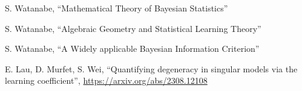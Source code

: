 \documentclass[a4paper,11pt]{amsart}
\begin{document}
\begin{thebibliography}{99}

 S. Watanabe, ``Mathematical Theory of Bayesian Statistics''

 S. Watanabe, ``Algebraic Geometry and Statistical Learning Theory''

 S. Watanabe, ``A Widely applicable Bayesian Information Criterion''
  
 E. Lau, D. Murfet, S. Wei, ``Quantifying degeneracy in singular models via the learning coefficient'', \url{https://arxiv.org/abs/2308.12108}

\end{thebibliography}
  
\end{document}
